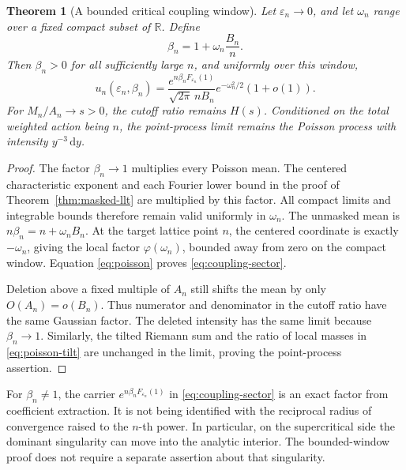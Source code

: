 \documentclass[11pt,a4paper]{article}
\numberwithin{equation}{section}
\newtheorem{theorem}{Theorem}[section]
\theoremstyle{definition}
\theoremstyle{remark}
\newcommand{\R}{\mathbb R}
\newcommand{\eps}{\varepsilon}
\newcommand{\dd}{\,\mathrm d}
\newcommand{\ph}{\varphi}
\begin{document}
\begin{theorem}[A bounded critical coupling window]
\label{thm:coupling}
Let \(\eps_n\to0\), and let \(\omega_n\) range over a fixed compact subset
of \(\R\). Define
\begin{equation}
 \beta_n=1+\omega_n\frac{B_n}{n}.
 \label{eq:beta-window}
\end{equation}
Then \(\beta_n>0\) for all sufficiently large \(n\), and uniformly over
this window,
\begin{equation}
 u_n(\eps_n,\beta_n)
 =\frac{e^{n\beta_nF_{\eps_n}(1)}}{\sqrt{2\pi}\,nB_n}
    e^{-\omega_n^2/2}(1+o(1)).
 \label{eq:coupling-sector}
\end{equation}
For \(M_n/A_n\to s>0\), the cutoff ratio remains \(H(s)\). Conditioned on
the total weighted action being \(n\), the point-process limit remains the
Poisson process with intensity \(y^{-3}\dd y\).
\end{theorem}
\begin{proof}
The factor \(\beta_n\to1\) multiplies every Poisson mean. The centered
characteristic exponent and each Fourier lower bound in the proof of
Theorem~\ref{thm:masked-llt} are multiplied by this factor. All compact
limits and integrable bounds therefore remain valid uniformly in
\(\omega_n\). The unmasked mean is \(n\beta_n=n+\omega_nB_n\). At the
target lattice point \(n\), the centered coordinate is exactly
\(-\omega_n\), giving the local factor \(\ph(\omega_n)\), bounded away from
zero on the compact window. Equation \eqref{eq:poisson} proves
\eqref{eq:coupling-sector}.

Deletion above a fixed multiple of \(A_n\) still shifts the mean by only
\(O(A_n)=o(B_n)\). Thus numerator and denominator in the cutoff ratio have
the same Gaussian factor. The deleted intensity has the same limit because
\(\beta_n\to1\). Similarly, the tilted Riemann sum and the ratio of local
masses in \eqref{eq:poisson-tilt} are unchanged in the limit, proving the
point-process assertion.
\end{proof}

For \(\beta_n\ne1\), the carrier \(e^{n\beta_nF_{\eps_n}(1)}\) in
\eqref{eq:coupling-sector} is an exact factor from coefficient extraction.
It is not being identified with the reciprocal radius of convergence raised
to the \(n\)-th power. In particular, on the supercritical side the dominant
singularity can move into the analytic interior. The bounded-window proof
does not require a separate assertion about that singularity.
\end{document}
